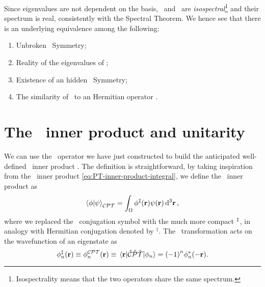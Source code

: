             Since eigenvalues are not dependent on the basis, \hH\ and \hF\ are \emph{isospectral}\footnote{Isospectrality means that the two operators share the same spectrum.} and their spectrum is real, consistently with the Spectral Theorem. We hence see that there is an underlying equivalence among the following:
            \begin{enumerate}[label = \mybullet]
                \item Unbroken \PT\ Symmetry;
                \item Reality of the eigenvalues of \hH;
                \item Existence of an hidden \CPT\ Symmetry;
                \item The similarity of \hH\ to an Hermitian operator \hF.
            \end{enumerate}

    \section{The \CPT\ inner product and unitarity}
        We can use the \hC\ operator we have just constructed to build the anticipated well-defined \CPT\ inner product \cite{bender2024}. The definition is straightforward, by taking inspiration from the \PT\ inner product \eqref{eq:PT-inner-product-integral}, we define the \CPT\ inner product as
        \begin{equation}
            \label{eq:CPT-inner-product}
            \braket{\phi}{\psi}_{\CPT} = \int\nolimits_\Omega \phi^{\myconj}\pqty{\vb{r}} \psi\pqty{\vb{r}} \dd[3]{\vb{r}}
            \mycomma
        \end{equation}
        where we replaced the \CPT\ conjugation symbol with the much more compact $^\ddag$, in analogy with Hermitian conjugation denoted by $^\dag$. The \CPT\ transformation acts on the wavefunction of an eigenstate as 
        \begin{equation}
            \label{eq:CPT-conjugation}
            \phi_n^\myconj\pqty{\vb{r}}
            \equiv \phi_n^{\CPT}\pqty{\vb{r}}
            \equiv \mel{\vb{r}}{\hCPT}{\phi_n}
            = \pqty{-1}^n \phi_n^*\pqty{-\vb{r}}
            \myperiod
        \end{equation}

